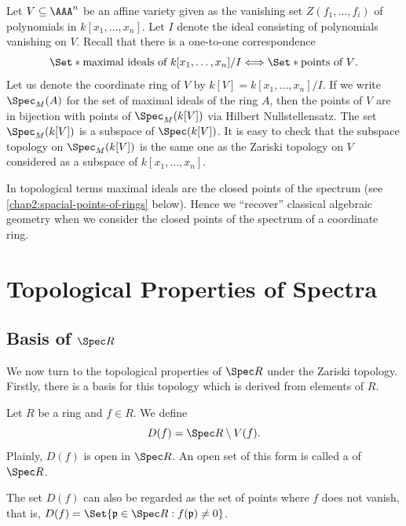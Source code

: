 \begin{example}
	Let $V \subseteq \AAA^n$ be an affine variety given as the vanishing set $Z(f_1, \dotsc, f_i)$ of polynomials in $k[x_1, \dotsc, x_n]$. Let $I$ denote the ideal consisting of polynomials vanishing on $V$. Recall that there is a one-to-one correspondence
	\begin{equation*}
		\Set*{\text{maximal ideals of $k[x_1, \dotsc, x_n]/I$}} \Longleftrightarrow \Set*{\text{points of $V$}}.
	\end{equation*}
	Let us denote the coordinate ring of $V$ by $k[V] =k[x_1, \dotsc, x_n]/I$. If we write $\Spec_{M}(A)$ for the set of maximal ideals of the ring $A$, then the points of $V$ are in bijection with points of $\Spec_{M}(k[V])$ via Hilbert Nullstellensatz. The set $\Spec_{M}(k[V])$ is a subspace of $\Spec(k[V])$. It is easy to check that the subspace topology on $\Spec_{M}(k[V])$ is the same one as the Zariski topology on $V$ considered as a subspace of $k[x_1, \dotsc, x_n]$.
\end{example}

In topological terms maximal ideals are the closed points of the spectrum (see \cref{chap2:spacial-points-of-rings} below). Hence we ``recover'' classical algebraic geometry when we consider the closed points of the spectrum of a coordinate ring.

\section{Topological Properties of Spectra}

\subsection*{Basis of $\Spec R$}
We now turn to the topological properties of $\Spec R$ under the Zariski topology. Firstly, there is a basis for this topology which is derived from elements of $R$.

\begin{definition}
	Let $R$ be a ring and $f \in R$. We define
	\begin{equation*}
		D(f) = \Spec R \setminus V(f).
	\end{equation*} 
	Plainly, $D(f)$ is open in $\Spec R$. An open set of this form is called a  of $\Spec R$.
\end{definition}

The set $D(f)$ can also be regarded as the set of points where $f$ does not vanish, that is, $D(f) = \Set{\mathfrak{p} \in \Spec R : f(\mathfrak{p}) \neq 0}$.

